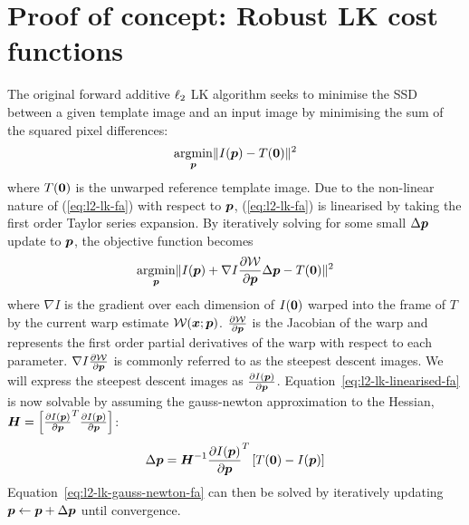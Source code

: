 \section{Proof of concept: Robust LK cost functions}\label{sec:proof-of-concept-lk}
The original forward additive $\ell_2$ LK algorithm \cite{RefWorks:71,RefWorks:10} seeks to minimise the SSD between a given template image and an input image by minimising the sum of the squared pixel differences:
\begin{equation}\label{eq:l2-lk-fa}
    \argmin_{\p} \norm{I(\p) - T(\zero)}^2
\end{equation}
where $T(\boldsymbol{0})$ is the unwarped reference template image. Due to the non-linear nature of (\ref{eq:l2-lk-fa}) with respect to $\boldsymbol{p}$, (\ref{eq:l2-lk-fa}) is linearised by taking the first order Taylor series expansion. By iteratively solving for some small $\Delta \boldsymbol{p}$ update to $\boldsymbol{p}$, the objective function becomes
\begin{equation}\label{eq:l2-lk-linearised-fa}
    \argmin_{\p} \norm{I(\p) + \nabla I \frac{\partial \mathcal{W}}{\partial \p} \Delta \p - T(\zero)}^2
\end{equation}
where $\nabla I$ is the gradient over each dimension of $I(\boldsymbol{0})$ warped into the frame of $T$ by the current warp estimate $\mathcal{W}(\boldsymbol{x};\boldsymbol{p})$.  $\frac{\partial \mathcal{W}}{\partial \boldsymbol{p}}$ is the Jacobian of the warp and represents the first order partial derivatives of the warp with respect to each parameter. $\nabla I \frac{\partial \mathcal{W}}{\partial \boldsymbol{p}}$ is commonly referred to as the steepest descent images. We will express the steepest descent images as $\frac{\partial I(\boldsymbol{p})}{\partial \boldsymbol{p}}$. Equation~\ref{eq:l2-lk-linearised-fa} is now solvable by assuming the gauss-newton approximation to the Hessian, $\boldsymbol{H} = \left[ {\frac{\partial I(\boldsymbol{p})}{\partial \boldsymbol{p}}}^T \frac{\partial I(\boldsymbol{p})}{\partial \boldsymbol{p}} \right]$:
\begin{equation}\label{eq:l2-lk-gauss-newton-fa}
    \Delta \p = \boldsymbol{H}^{-1} \frac{\partial I(\p)}{\partial \p}^T \left[ T(\zero) - I(\p) \right]
\end{equation}
Equation~\ref{eq:l2-lk-gauss-newton-fa} can then be solved by iteratively updating $\boldsymbol{p} \leftarrow \boldsymbol{p} + \Delta \boldsymbol{p}$ until convergence.
